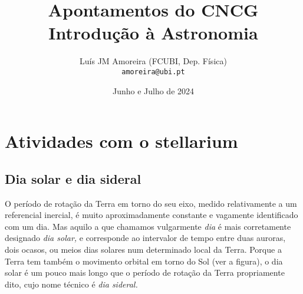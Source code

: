 \documentclass{article}
\title{Apontamentos do CNCG Introdução à Astronomia}
\author{Luís JM Amoreira (FCUBI, Dep. Física)\\
\texttt{amoreira@ubi.pt}}
\date{Junho e Julho de 2024}
\begin{document}
\maketitle
\section{Atividades com o stellarium}
\subsection{Dia solar e dia sideral}
\label{sec:dsoldsid}
\begin{minipage}[t]{0.7\linewidth}
O período de rotação da Terra em torno do seu eixo, medido relativamente a um
referencial inercial, é muito aproximadamente constante e vagamente identificado
com um dia. Mas aquilo a que chamamos vulgarmente \emph{dia} é mais corretamente
designado \emph{dia solar,} e corresponde ao intervalor de tempo entre duas
auroras, dois ocasos, ou meios dias solares num determinado local da Terra.
Porque a Terra tem também o movimento orbital em torno do Sol (ver a figura),
o dia solar é um pouco mais longo que o período de rotação da Terra propriamente
dito, cujo nome técnico é \emph{dia sideral.}
\end{minipage}\hfill
{}
\end{document}
